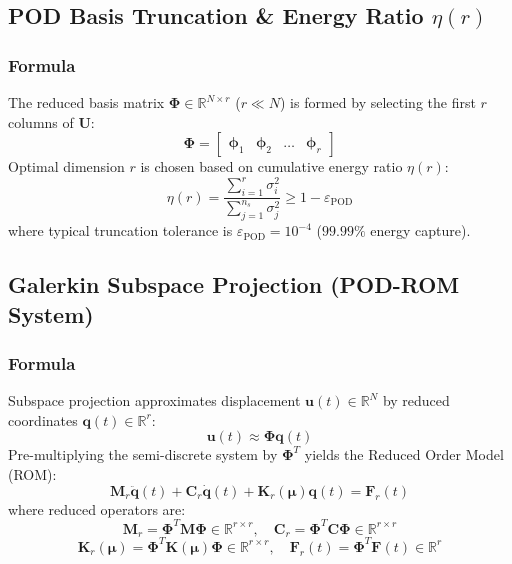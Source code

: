 \hr

\subsection{POD Basis Truncation \& Energy Ratio $\eta(r)$}

\subsubsection{Formula}
The reduced basis matrix $\boldsymbol{\Phi} \in \mathbb{R}^{N \times r}$ ($r \ll N$) is formed by selecting the first $r$ columns of $\mathbf{U}$:
\begin{equation}
\boldsymbol{\Phi} = \begin{bmatrix} \mathbf{\phi}_1 & \mathbf{\phi}_2 & \dots & \mathbf{\phi}_r \end{bmatrix}
\end{equation}
Optimal dimension $r$ is chosen based on cumulative energy ratio $\eta(r)$:
\begin{equation}
\eta(r) = \frac{\sum_{i=1}^r \sigma_i^2}{\sum_{j=1}^{n_s} \sigma_j^2} \ge 1 - \varepsilon_{\text{POD}}
\end{equation}
where typical truncation tolerance is $\varepsilon_{\text{POD}} = 10^{-4}$ ($99.99\%$ energy capture).

\hr

\subsection{Galerkin Subspace Projection (POD-ROM System)}

\subsubsection{Formula}
Subspace projection approximates displacement $\mathbf{u}(t) \in \mathbb{R}^N$ by reduced coordinates $\mathbf{q}(t) \in \mathbb{R}^r$:
\begin{equation}
\mathbf{u}(t) \approx \boldsymbol{\Phi} \mathbf{q}(t)
\end{equation}
Pre-multiplying the semi-discrete system by $\boldsymbol{\Phi}^T$ yields the Reduced Order Model (ROM):
\begin{equation}
\mathbf{M}_r \ddot{\mathbf{q}}(t) + \mathbf{C}_r \dot{\mathbf{q}}(t) + \mathbf{K}_r(\boldsymbol{\mu}) \mathbf{q}(t) = \mathbf{F}_r(t)
\end{equation}
where reduced operators are:
\begin{equation}
\mathbf{M}_r = \boldsymbol{\Phi}^T \mathbf{M} \boldsymbol{\Phi} \in \mathbb{R}^{r \times r}, \quad 
\mathbf{C}_r = \boldsymbol{\Phi}^T \mathbf{C} \boldsymbol{\Phi} \in \mathbb{R}^{r \times r}
\end{equation}
\begin{equation}
\mathbf{K}_r(\boldsymbol{\mu}) = \boldsymbol{\Phi}^T \mathbf{K}(\boldsymbol{\mu}) \boldsymbol{\Phi} \in \mathbb{R}^{r \times r}, \quad 
\mathbf{F}_r(t) = \boldsymbol{\Phi}^T \mathbf{F}(t) \in \mathbb{R}^r
\end{equation}

